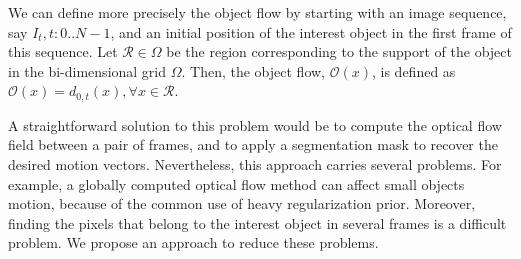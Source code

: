 We can define more precisely the object flow by starting with an image sequence, say $I_t, t:0..N-1$, and an initial 
position of the interest object in the first frame of this sequence. Let $\mathcal{R} \in \Omega$ be the region corresponding to the support of the object in the
bi-dimensional grid $\Omega$. Then, the object flow, $\mathcal{O}(x)$,  is defined as $\mathcal{O}(x) = d_{0,t}(x), \forall x \in \mathcal{R}$.

A straightforward solution to this problem would be to compute the optical flow field between a pair of frames, and to apply 
a segmentation mask to recover the desired motion vectors. Nevertheless, this approach carries several 
problems. For example, a globally computed optical flow method can affect small objects motion, because of 
the common use of heavy regularization prior. Moreover, finding the pixels that belong to the interest object in several frames is a difficult problem. 
We propose an approach to reduce these problems.



